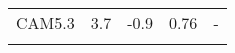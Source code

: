 \documentclass[draft,grl]{agutexSI}
\begin{document}
\begin{table}
\begin{center}
\begin{tabular}{*{5}{c}}
    CAM5.3     & 3.7                      &  -0.9                         &           0.76                                          &   -        \\ 
    \\
     \end{tabular}\par
     \label{LCCtable}
\end{center}
\end{table}



%
\end{document}
